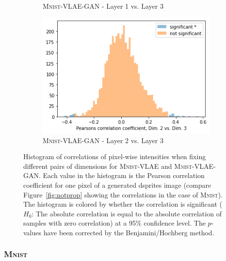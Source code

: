 \begin{figure}
\begin{subfigure}{.3\textwidth}
        \caption{\textsc{Mnist}-VLAE-GAN - Layer 1 vs. Layer 3}
    \end{subfigure}
    \hfill
    \begin{subfigure}{.3\textwidth}
        \includegraphics[width=\textwidth]{images/notprop/dsprites/vlae_gan/dim_2_3.png}
        \caption{\textsc{Mnist}-VLAE-GAN - Layer 2 vs. Layer 3}
    \end{subfigure}
    \caption[\textsc{Mnist}-VLAE and \textsc{Mnist}-VLAE-GAN - Pixel intensity correlation]{Histogram of correlations of pixel-wise intensities when fixing different pairs of dimensions for \textsc{Mnist}-\ac{VLAE} and \textsc{Mnist}-\ac{VLAE}-\ac{GAN}.
    Each value in the histogram is the Pearson correlation coefficient for one pixel of a generated dsprites image (compare Figure~\ref{fig:notprop} showing the correlations in the case of \textsc{Mnist}).
    The histogram is colored by whether the correlation is significant ($H_0$: The absolute correlation is equal to the absolute correlation of samples with zero correlation) at a 95\% confidence level.
    The $p$-values have been corrected by the Benjamini/Hochberg method.}
    \label{fig:mnist_vlae_notprop}
\end{figure}

\subsubsection{\textsc{Mnist}}

